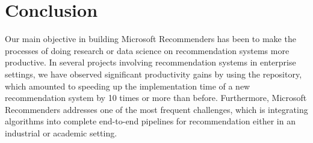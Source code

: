 \section{Conclusion}

Our main objective in building Microsoft Recommenders has been to make the processes of 
doing research or data science on recommendation systems more productive.
In several projects involving recommendation systems in enterprise settings, we have observed significant productivity gains by using the repository,
which amounted to speeding up the implementation time of a new recommendation 
system by 10 times or more than before.
Furthermore, Microsoft Recommenders addresses one of the most frequent challenges, which is integrating
algorithms into complete end-to-end pipelines for recommendation either in an industrial or 
academic setting.